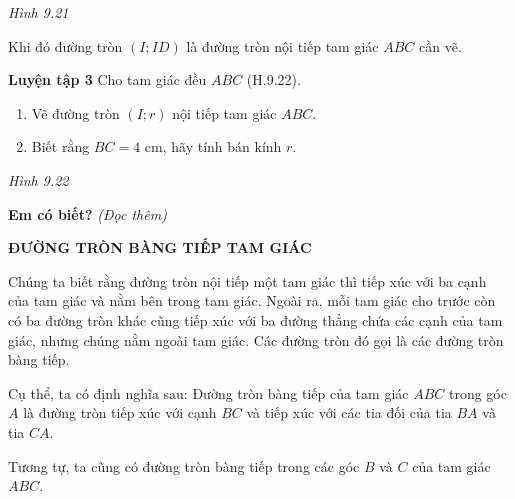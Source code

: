 \begin{lesson}
\begin{center}
    \textit{Hình 9.21}
    \end{center}

    Khi đó đường tròn $(I;ID)$ là đường tròn nội tiếp tam giác $ABC$ cần vẽ.

    \textbf{Luyện tập 3} Cho tam giác đều $ABC$ (H.9.22).
    \begin{enumerate}[label=\alph*)]
        \item Vẽ đường tròn $(I;r)$ nội tiếp tam giác $ABC$.

        \answerline
        \item Biết rằng $BC=4$ cm, hãy tính bán kính $r$.

        \answerline
        \answerline
    \end{enumerate}

    \begin{center}

    \textit{Hình 9.22}
    \end{center}

    \textbf{Em có biết?} \textit{(Đọc thêm)}

    \textbf{ĐƯỜNG TRÒN BÀNG TIẾP TAM GIÁC}

    Chúng ta biết rằng đường tròn nội tiếp một tam giác thì tiếp xúc với ba cạnh của tam giác và nằm bên trong tam giác. Ngoài ra, mỗi tam giác cho trước còn có ba đường tròn khác cũng tiếp xúc với ba đường thẳng chứa các cạnh của tam giác, nhưng chúng nằm ngoài tam giác. Các đường tròn đó gọi là các đường tròn bàng tiếp.

    Cụ thể, ta có định nghĩa sau: Đường tròn bàng tiếp của tam giác $ABC$ trong góc $A$ là đường tròn tiếp xúc với cạnh $BC$ và tiếp xúc với các tia đối của tia $BA$ và tia $CA$.

    Tương tự, ta cũng có đường tròn bàng tiếp trong các góc $B$ và $C$ của tam giác $ABC$.


\end{lesson}
